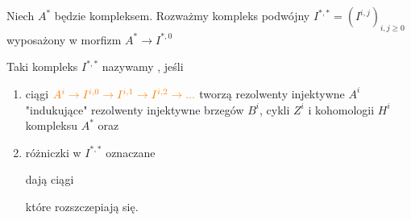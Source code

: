   \begin{definition}
    Niech $A^*$ będzie kompleksem. Rozważmy kompleks podwójny $I^{*,*}=(I^{i,j})_{i,j\geq 0}$ wyposażony w morfizm $A^*\to I^{*,0}$

    \begin{center}
    \end{center}

    Taki kompleks $I^{*,*}$ nazywamy , jeśli
    \begin{enumerate}
      \item ciągi $\color{orange}A^i\to I^{i,0}\to I^{i, 1}\to I^{i,2} \to ...$ tworzą rezolwenty injektywne $A^i$ "indukujące" rezolwenty injektywne brzegów $B^i$, cykli $Z^i$ i kohomologii $H^i$ kompleksu $A^*$ oraz
      \item różniczki w $I^{*,*}$ oznaczane
    \begin{center}\end{center}
    dają ciągi 
    \begin{center}\end{center}
    które rozszczepiają się.
\end{enumerate}
  \end{definition}



